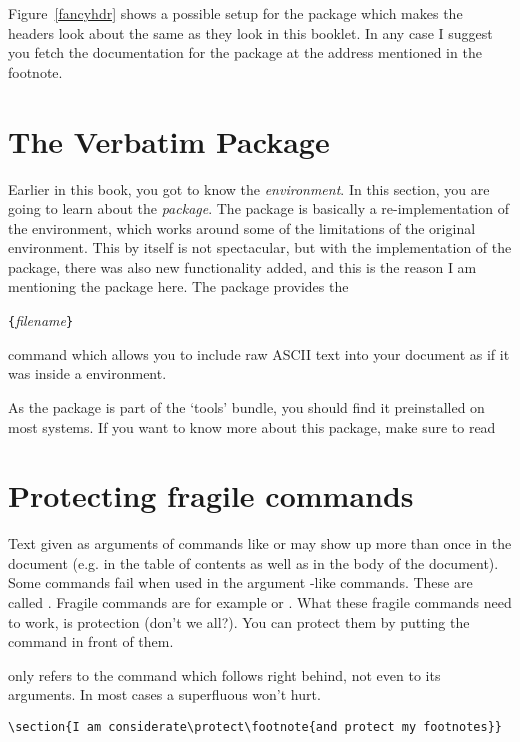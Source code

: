  
Figure~\ref{fancyhdr} shows a possible setup for the 
package which makes the headers look about the same as they look in
this booklet. In any case I suggest you fetch the documentation for
the package at the address mentioned in the footnote. 

\section{The Verbatim Package}

Earlier in this book, you got to know the 
\emph{environment}.  In this section, you are going to learn about the
 \emph{package}. The  package is basically
a re-implementation of the  environment, which works around
some of the limitations of the original  environment.
This by itself is not spectacular, but with the implementation of the
 package, there was also new functionality added, and
this is the reason I am mentioning the package here. The 
package provides the

\begin{command}
\verb|{|\emph{filename}\verb|}|
\end{command}

\noindent command which allows you to include raw ASCII text into your
document as if it was inside a  environment.

As the  package is part of the `tools' bundle, you
should find it preinstalled on most systems. If you want to know more
about this package, make sure to read \cite{verbatim} 


\section{Protecting fragile commands}

Text given as arguments of commands like  or  may
show up more than once in the document (e.g. in the table of contents as
well as in the body of the document). Some commands fail when used in the
argument -like commands. These are called .
Fragile commands are for example  or . What these
fragile commands need to work, is protection (don't we all?). You can
protect them by putting the  command in front of them.

 only refers to the command which follows right behind, not even
to its arguments. In most cases a superfluous  won't hurt.

\begin{code}
\verb|\section{I am considerate\protect\footnote{and protect my footnotes}}|
\end{code}











